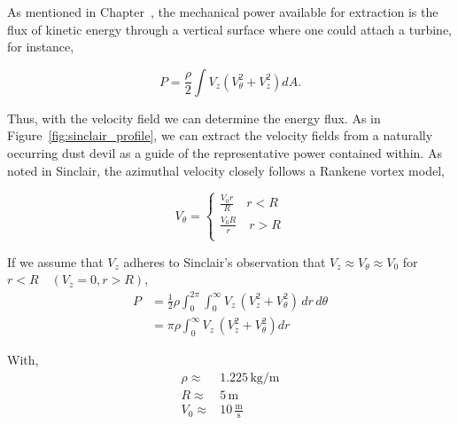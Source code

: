 \label{scaling}

As mentioned in Chapter~\label{sec:physics}, the mechanical power
available for extraction is the flux of kinetic energy through a
vertical surface where one could attach a turbine, for instance, 

\begin{equation}
 P = \frac{\rho }{2} \int V_z (V_{\theta}^2 + V_z^2 ) dA. 
\end{equation}

Thus, with the velocity field we can determine the energy
flux. As in Figure~\ref{fig:sinclair_profile}, we can extract the
velocity fields from a naturally occurring dust devil as a guide of the 
representative power contained within. As noted in Sinclair, the
azimuthal velocity closely follows a Rankene vortex model, 

\begin{equation}
 V_{\theta} = 
  \begin{cases}
   \frac{V_0 r}{R} \quad r < R \\
   \frac{V_0 R}{r} \quad r > R \\
  \end{cases}
\end{equation}

If we assume that $V_z$ adheres to Sinclair's observation that $V_z \approx
V_{\theta} \approx V_0$ for $r < R \quad (V_z=0,r>R)$, 
\begin{eqnarray}
 P &= \frac{1}{2} \rho \int_0^{2\pi}\int_0^{\infty} V_z \, (V^2_z +
  V_{\theta}^2)\, dr \, d\theta \\ 
 &= \pi \rho \int_0^{\infty} V_z \, (V^2_z + V_{\theta}^2) dr
\end{eqnarray}


With, 
\begin{eqnarray}
 \rho \approx& 1.225 \,\text{kg}/\text{m} \\
 R \approx& 5 \,\text{m} \\
 V_0 \approx& 10 \,\frac{\text{m}}{\text{s}}
\end{eqnarray}